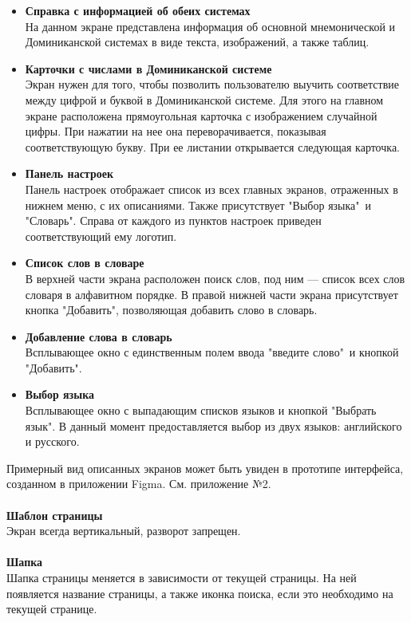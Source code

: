 \documentclass[draft]{article}
\begin{document}
\begin{itemize}
\item \textbf{Справка с информацией об обеих системах}\\
На данном экране представлена информация об основной мнемонической и Доминиканской системах в виде текста, изображений, а также таблиц.
\item \textbf{Карточки с числами в Доминиканской системе}\\
Экран нужен для того, чтобы позволить пользователю выучить соответствие между цифрой и буквой в Доминиканской системе. Для этого на главном экране расположена прямоугольная карточка с изображением случайной цифры. При нажатии на нее она переворачивается, показывая соответствующую букву. При ее листании открывается следующая карточка.
\item \textbf{Панель настроек}\\
Панель настроек отображает список из всех главных экранов, отраженных в нижнем меню, с их описаниями. Также присутствует "{}Выбор языка"{}\ и "{}Словарь"{}. Справа от каждого из пунктов настроек приведен соответствующий ему логотип.
\item \textbf{Список слов в словаре}\\
В верхней части экрана расположен поиск слов, под ним — список всех слов словаря в алфавитном порядке. В правой нижней части экрана присутствует кнопка "{}Добавить"{}, позволяющая добавить слово в словарь.
\item \textbf{Добавление слова в словарь}\\
Всплывающее окно с единственным полем ввода "{}введите слово"{}\ и кнопкой "{}Добавить"{}.
\item \textbf{Выбор языка}\\
Всплывающее окно с выпадающим списков языков и кнопкой "{}Выбрать язык"{}. В данный момент предоставляется выбор из двух языков: английского и русского.
\end{itemize}
Примерный вид описанных экранов может быть увиден в прототипе интерфейса, созданном в приложении Figma. См. приложение №2.\\
~\\
\textbf{Шаблон страницы}\\
Экран всегда вертикальный, разворот запрещен.\\
~\\
\textbf{Шапка}\\
Шапка страницы меняется в зависимости от текущей страницы. На ней появляется название страницы, а также иконка поиска, если это необходимо на текущей странице.\\
\end{document}
